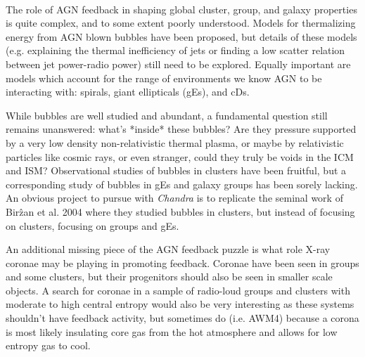 \documentclass[11pt]{article}
\begin{document}

\\
The role of AGN feedback in shaping global cluster, group, and galaxy
properties is quite complex, and to some extent poorly
understood. Models for thermalizing energy from AGN blown bubbles have
been proposed, but details of these models (e.g. explaining the
thermal inefficiency of jets or finding a low scatter relation between
jet power-radio power) still need to be explored. Equally important
are models which account for the range of environments we know AGN to
be interacting with: spirals, giant ellipticals (gEs), and cDs.

While bubbles are well studied and abundant, a fundamental question
still remains unanswered: what's *inside* these bubbles? Are they
pressure supported by a very low density non-relativistic thermal
plasma, or maybe by relativistic particles like cosmic rays, or even
stranger, could they truly be voids in the ICM and ISM? Observational
studies of bubbles in clusters have been fruitful, but a corresponding
study of bubbles in gEs and galaxy groups has been sorely lacking. An
obvious project to pursue with {\it Chandra} is to replicate the
seminal work of Bir\^{z}an et al. 2004 where they studied bubbles in
clusters, but instead of focusing on clusters, focusing on groups and
gEs.

An additional missing piece of the AGN feedback puzzle is what
role X-ray coronae may be playing in promoting feedback. Coronae
have been seen in groups and some clusters, but their progenitors
should also be seen in smaller scale objects. A search for coronae in
a sample of radio-loud groups and clusters with moderate to high
central entropy would also be very interesting as these systems
shouldn't have feedback activity, but sometimes do (i.e. AWM4) because
a corona is most likely insulating core gas from the hot atmosphere
and allows for low entropy gas to cool.\\
\end{document}
